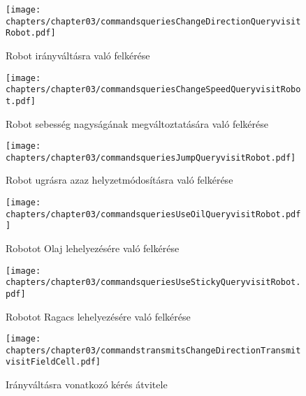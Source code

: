 \begin{itemize}
\clearpage

\begin{figure}[h]
	\begin{center}
		\texttt{[image: chapters/chapter03/commandsqueriesChangeDirectionQueryvisitRobot.pdf]}
		\caption{Robot irányváltásra való felkérése}
		\label{fig:command.executes.ChangeDirectionQuery.visit}
	\end{center}
\end{figure}

\begin{figure}[h]
	\begin{center}
		\texttt{[image: chapters/chapter03/commandsqueriesChangeSpeedQueryvisitRobot.pdf]}
		\caption{Robot sebesség nagyságának megváltoztatására való felkérése}
		\label{fig:command.executes.ChangeSpeedQuery.visit}
	\end{center}
\end{figure}

\begin{figure}[h]
	\begin{center}
		\texttt{[image: chapters/chapter03/commandsqueriesJumpQueryvisitRobot.pdf]}
		\caption{Robot ugrásra azaz helyzetmódosításra való felkérése}
		\label{fig:command.executes.JumpQuery.visit}
	\end{center}
\end{figure}

\begin{figure}[h]
	\begin{center}
		\texttt{[image: chapters/chapter03/commandsqueriesUseOilQueryvisitRobot.pdf]}
		\caption{Robotot Olaj lehelyezésére való felkérése}
		\label{fig:command.executes.UseOilQuery.visit}
	\end{center}
\end{figure}

\begin{figure}[h]
	\begin{center}
		\texttt{[image: chapters/chapter03/commandsqueriesUseStickyQueryvisitRobot.pdf]}
		\caption{Robotot Ragacs lehelyezésére való felkérése}
		\label{fig:command.executes.UseStickyQuery.visit}
	\end{center}
\end{figure}

\begin{figure}[h]
	\begin{center}
		\texttt{[image: chapters/chapter03/commandstransmitsChangeDirectionTransmitvisitFieldCell.pdf]}
		\caption{Irányváltásra vonatkozó kérés átvitele}
		\label{fig:command.executes.ChangeDirectionTransmit.visit}
	\end{center}
\end{figure}


\end{itemize}

